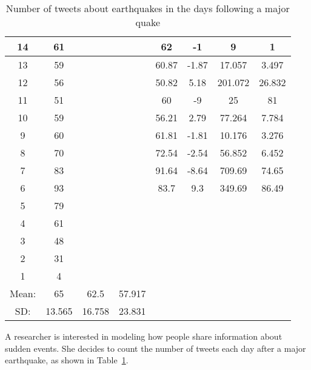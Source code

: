 \documentclass[11pt]{exam}
\begin{document}
\begin{questions}
\begin{table}[ht]
\begin{center}
\begin{tabular}{|c|c|c|c|c|c|c|c|}
  \hline
14 & 61 &  &  & 62 & -1 & 9 & 1 \\ 
   \hline
13 & 59 &  &  & 60.87 & -1.87 & 17.057 & 3.497 \\ 
   \hline
12 & 56 &  &  & 50.82 & 5.18 & 201.072 & 26.832 \\ 
   \hline
11 & 51 &  &  & 60 & -9 & 25 & 81 \\ 
   \hline
10 & 59 &  &  & 56.21 & 2.79 & 77.264 & 7.784 \\ 
   \hline
9 & 60 &  &  & 61.81 & -1.81 & 10.176 & 3.276 \\ 
   \hline
8 & 70 &  &  & 72.54 & -2.54 & 56.852 & 6.452 \\ 
   \hline
7 & 83 &  &  & 91.64 & -8.64 & 709.69 & 74.65 \\ 
   \hline
6 & 93 &  &  & 83.7 & 9.3 & 349.69 & 86.49 \\ 
   \hline
5 & 79 &  &  &  &  &  &  \\ 
   \hline
4 & 61 &  &  &  &  &  &  \\ 
   \hline
3 & 48 &  &  &  &  &  &  \\ 
   \hline
2 & 31 &  &  &  &  &  &  \\ 
  1 & 4 &  &  &  &  &  &  \\ 
  Mean: & 65 & 62.5 & 57.917 &  &  &  &  \\ 
  SD: & 13.565 & 16.758 & 23.831 &  &  &  &  \\ 
  \end{tabular}
\caption{Number of tweets about earthquakes in the days following a major quake}
\label{tab:quake}
\end{center}
\end{table}\fi

 
  \question A researcher is interested in modeling how people share
  information about sudden events.  She decides to count the number of
  tweets each day after a major earthquake, as shown in
  Table~\ref{tab:quake}. 
\end{questions}
\end{document}

